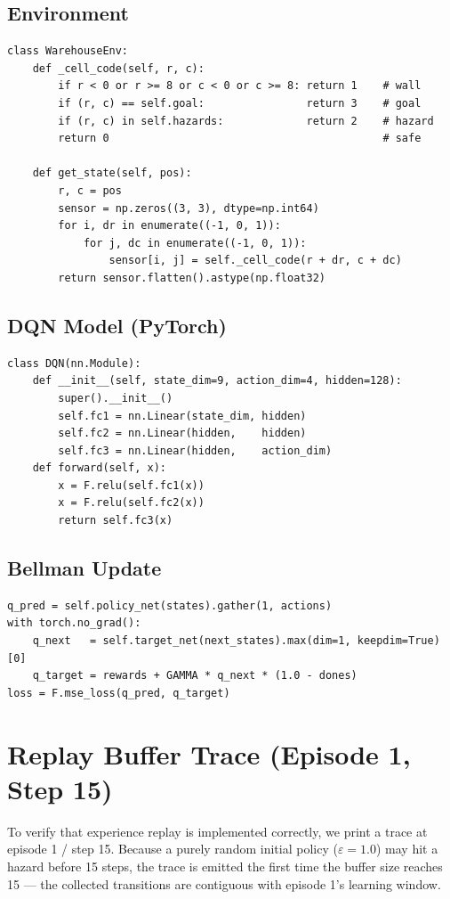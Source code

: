 \documentclass[11pt]{article}
\begin{document}
\subsection{Environment}
\begin{lstlisting}
class WarehouseEnv:
    def _cell_code(self, r, c):
        if r < 0 or r >= 8 or c < 0 or c >= 8: return 1    # wall
        if (r, c) == self.goal:                return 3    # goal
        if (r, c) in self.hazards:             return 2    # hazard
        return 0                                           # safe

    def get_state(self, pos):
        r, c = pos
        sensor = np.zeros((3, 3), dtype=np.int64)
        for i, dr in enumerate((-1, 0, 1)):
            for j, dc in enumerate((-1, 0, 1)):
                sensor[i, j] = self._cell_code(r + dr, c + dc)
        return sensor.flatten().astype(np.float32)
\end{lstlisting}

\subsection{DQN Model (PyTorch)}
\begin{lstlisting}
class DQN(nn.Module):
    def __init__(self, state_dim=9, action_dim=4, hidden=128):
        super().__init__()
        self.fc1 = nn.Linear(state_dim, hidden)
        self.fc2 = nn.Linear(hidden,    hidden)
        self.fc3 = nn.Linear(hidden,    action_dim)
    def forward(self, x):
        x = F.relu(self.fc1(x))
        x = F.relu(self.fc2(x))
        return self.fc3(x)
\end{lstlisting}

\subsection{Bellman Update}
\begin{lstlisting}
q_pred = self.policy_net(states).gather(1, actions)
with torch.no_grad():
    q_next   = self.target_net(next_states).max(dim=1, keepdim=True)[0]
    q_target = rewards + GAMMA * q_next * (1.0 - dones)
loss = F.mse_loss(q_pred, q_target)
\end{lstlisting}

\section{Replay Buffer Trace (Episode 1, Step 15)}

To verify that experience replay is implemented correctly, we print a trace at episode 1 / step 15. Because a purely random initial policy ($\varepsilon=1.0$) may hit a hazard before 15 steps, the trace is emitted the first time the buffer size reaches 15 --- the collected transitions are contiguous with episode 1's learning window.
\end{document}
